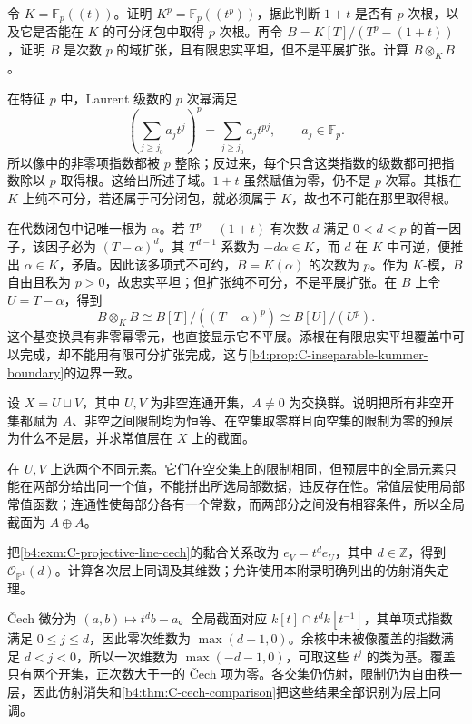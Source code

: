 \begin{exercise}\label{b4:ex:C-inseparable-kummer-boundary}
	令 \(K=\mathbb F_p(\!(t)\!)\)。证明 \(K^p=\mathbb F_p(\!(t^p)\!)\)，据此判断 \(1+t\) 是否有 \(p\) 次根，以及它是否能在 \(K\) 的可分闭包中取得 \(p\) 次根。再令 \(B=K[T]/(T^p-(1+t))\)，证明 \(B\) 是次数 \(p\) 的域扩张，且有限忠实平坦，但不是平展扩张。计算 \(B\otimes_K B\)。
\end{exercise}
\begin{solution}
	在特征 \(p\) 中，Laurent 级数的 \(p\) 次幂满足
	\[
		\left(\sum_{j\ge j_0}a_jt^j\right)^p =\sum_{j\ge j_0}a_jt^{pj},\qquad a_j\in\mathbb F_p.
	\]
	所以像中的非零项指数都被 \(p\) 整除；反过来，每个只含这类指数的级数都可把指数除以 \(p\) 取得根。这给出所述子域。\(1+t\) 虽然赋值为零，仍不是 \(p\) 次幂。其根在 \(K\) 上纯不可分，若还属于可分闭包，就必须属于 \(K\)，故也不可能在那里取得根。

	在代数闭包中记唯一根为 \(\alpha\)。若 \(T^p-(1+t)\) 有次数 \(d\) 满足 \(0<d<p\) 的首一因子，该因子必为 \((T-\alpha)^d\)。其 \(T^{d-1}\) 系数为 \(-d\alpha\in K\)，而 \(d\) 在 \(K\) 中可逆，便推出 \(\alpha\in K\)，矛盾。因此该多项式不可约，\(B=K(\alpha)\) 的次数为 \(p\)。作为 \(K\)-模，\(B\) 自由且秩为 \(p>0\)，故忠实平坦；但扩张纯不可分，不是平展扩张。在 \(B\) 上令 \(U=T-\alpha\)，得到
	\[
		B\otimes_K B\cong B[T]/((T-\alpha)^p) \cong B[U]/(U^p).
	\]
	这个基变换具有非零幂零元，也直接显示它不平展。添根在有限忠实平坦覆盖中可以完成，却不能用有限可分扩张完成，这与\cref{b4:prop:C-inseparable-kummer-boundary}的边界一致。
\end{solution}

\begin{exercise}\label{b4:ex:C-constant-presheaf}
	设 \(X=U\sqcup V\)，其中 \(U,V\) 为非空连通开集，\(A\ne0\) 为交换群。说明把所有非空开集都赋为 \(A\)、非空之间限制均为恒等、在空集取零群且向空集的限制为零的预层为什么不是层，并求常值层在 \(X\) 上的截面。
\end{exercise}
\begin{solution}
	在 \(U,V\) 上选两个不同元素。它们在空交集上的限制相同，但预层中的全局元素只能在两部分给出同一个值，不能拼出所选局部数据，违反存在性。常值层使用局部常值函数；连通性使每部分各有一个常数，而两部分之间没有相容条件，所以全局截面为 \(A\oplus A\)。
\end{solution}

\begin{exercise}\label{b4:ex:C-line-bundle-all-degrees}
	把\cref{b4:exm:C-projective-line-cech}的黏合关系改为 \(e_V=t^d e_U\)，其中 \(d\in\mathbb Z\)，得到 \(\mathcal O_{\mathbb P^1}(d)\)。计算各次层上同调及其维数；允许使用本附录明确列出的仿射消失定理。
\end{exercise}
\begin{solution}
	Čech 微分为 \((a,b)\mapsto t^d b-a\)。全局截面对应 \(k[t]\cap t^d k[t^{-1}]\)，其单项式指数满足 \(0\le j\le d\)，因此零次维数为 \(\max(d+1,0)\)。余核中未被像覆盖的指数满足 \(d<j<0\)，所以一次维数为 \(\max(-d-1,0)\)，可取这些 \(t^j\) 的类为基。覆盖只有两个开集，正次数大于一的 Čech 项为零。各交集仍仿射，限制仍为自由秩一层，因此仿射消失和\cref{b4:thm:C-cech-comparison}把这些结果全部识别为层上同调。
\end{solution}

